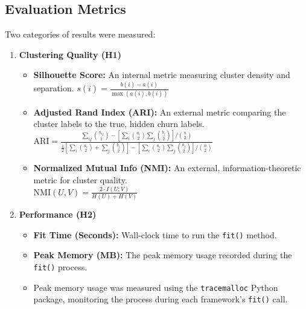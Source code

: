 \documentclass[twocolumn,a4paper]{article}
\begin{document}
\subsection{Evaluation Metrics}
Two categories of results were measured:
\begin{enumerate}
    \item \textbf{Clustering Quality (H1)}
    \begin{itemize}
        \item \textbf{Silhouette Score:} An internal metric measuring cluster density and separation. $s(i) = \frac{b(i)-a(i)}{\max(a(i),b(i))}$
        \item \textbf{Adjusted Rand Index (ARI):} An external metric comparing the cluster labels to the true, hidden churn labels. \\
        $\mathrm{ARI}=\frac{\sum_{ij}\binom{n_{ij}}{2}-\left[\sum_{i}\binom{a_i}{2}\sum_{j}\binom{b_j}{2}\right]/\binom{n}{2}}{\frac{1}{2}\left[\sum_{i}\binom{a_i}{2}+\sum_{j}\binom{b_j}{2}\right]-\left[\sum_{i}\binom{a_i}{2}\sum_{j}\binom{b_j}{2}\right]/\binom{n}{2}}$
        \item \textbf{Normalized Mutual Info (NMI):} An external, information-theoretic metric for cluster quality. \\
        $\mathrm{NMI}\left(U,V\right)=\frac{2\cdot I\left(U;V\right)}{H\left(U\right)+H\left(V\right)}$
    \end{itemize}
    \item \textbf{Performance (H2)}
    \begin{itemize}
        \item \textbf{Fit Time (Seconds):} Wall-clock time to run the \texttt{fit()} method.
        \item \textbf{Peak Memory (MB):} The peak memory usage recorded during the \texttt{fit()} process.
        \item Peak memory usage was measured using the \texttt{tracemalloc} Python package, monitoring the process during each framework’s \texttt{fit()} call.
    \end{itemize}
\end{enumerate}
\end{document}
